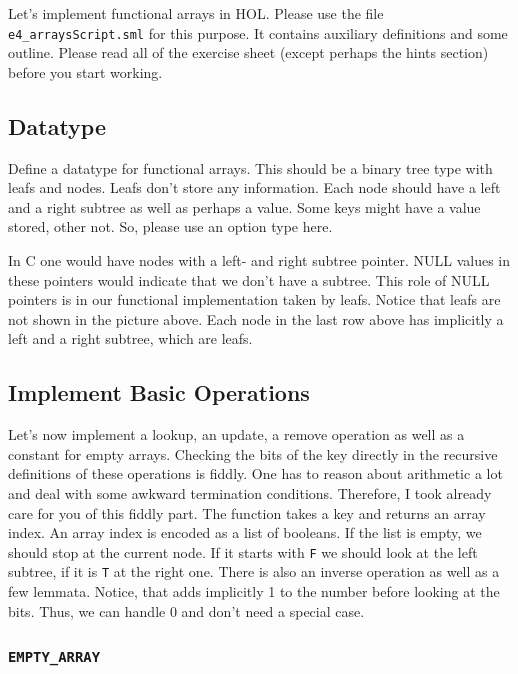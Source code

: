 \documentclass[a4paper,10pt,oneside]{scrartcl}
\begin{document}
\bigskip

Let's implement functional arrays in HOL. Please use the file
\texttt{e4\_arraysScript.sml} for this purpose. It contains auxiliary
definitions and some outline. Please read all of the exercise sheet
(except perhaps the hints section) before you start working.


\subsection{Datatype}

Define a datatype for functional arrays. This should be a binary tree type with leafs and nodes.
Leafs don't store any information. Each node should have a left and a right subtree as well as perhaps a value. Some keys might have a value stored, other not. So, please use an option type here.

In C one would have nodes with a left- and right subtree pointer. NULL values in these pointers would indicate that we don't have a subtree. This role of NULL pointers is in our functional implementation taken by leafs. Notice that leafs are not shown in the picture above. Each node in the last row above has implicitly a left and a right subtree, which are leafs. 


\subsection{Implement Basic Operations}

Let's now implement a lookup, an update, a remove operation as well as a constant for empty arrays.
Checking the bits of the key directly in the recursive definitions of these operations is fiddly.
One has to reason about arithmetic a lot and deal with some awkward termination conditions.
Therefore, I took already care for you of this fiddly part. The function  takes
a key and returns an array index. An array index is encoded as a list of booleans. If the list is empty, we should stop at the current node. If it starts with \texttt{F} we should look at the left subtree, if it is \texttt{T} at the right one. There is also an inverse operation  as well as a few lemmata. Notice, that  adds implicitly 1 to the number before
looking at the bits. Thus, we can handle 0 and don't need a special case.

\subsubsection{\texttt{EMPTY\_ARRAY}}
\end{document}
